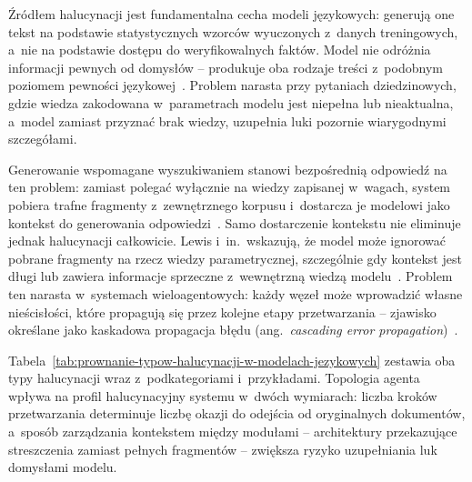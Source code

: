 Źródłem halucynacji jest fundamentalna cecha modeli językowych: generują one
tekst na podstawie statystycznych wzorców wyuczonych z~danych treningowych,
a~nie na podstawie dostępu do weryfikowalnych faktów. Model nie odróżnia
informacji pewnych od domysłów -- produkuje oba rodzaje treści z~podobnym
poziomem pewności językowej~\cite{ji2023survey}. Problem narasta przy pytaniach
dziedzinowych, gdzie wiedza zakodowana w~parametrach modelu jest niepełna lub
nieaktualna, a~model zamiast przyznać brak wiedzy, uzupełnia luki pozornie
wiarygodnymi szczegółami.

Generowanie wspomagane wyszukiwaniem stanowi bezpośrednią odpowiedź na ten
problem: zamiast polegać wyłącznie na wiedzy zapisanej w~wagach, system pobiera
trafne fragmenty z~zewnętrznego korpusu i~dostarcza je modelowi jako kontekst
do generowania odpowiedzi~\cite{lewis2020retrieval}. Samo dostarczenie
kontekstu nie eliminuje jednak halucynacji całkowicie. Lewis i~in.\ wskazują,
że model może ignorować pobrane fragmenty na rzecz wiedzy parametrycznej,
szczególnie gdy kontekst jest długi lub zawiera informacje sprzeczne
z~wewnętrzną wiedzą modelu~\cite{lewis2020retrieval}. Problem ten narasta
w~systemach wieloagentowych: każdy węzeł może wprowadzić własne nieścisłości,
które propagują się przez kolejne etapy przetwarzania -- zjawisko określane
jako kaskadowa propagacja błędu (ang.~\textit{cascading error
  propagation})~\cite{wang2024survey}.

Tabela~\ref{tab:prownanie-typow-halucynacji-w-modelach-jezykowych} zestawia oba
typy halucynacji wraz z~podkategoriami i~przykładami. Topologia agenta wpływa
na profil halucynacyjny systemu w~dwóch wymiarach: liczba kroków przetwarzania
determinuje liczbę okazji do odejścia od oryginalnych dokumentów, a~sposób
zarządzania kontekstem między modułami -- architektury przekazujące
streszczenia zamiast pełnych fragmentów -- zwiększa ryzyko uzupełniania luk
domysłami modelu.

